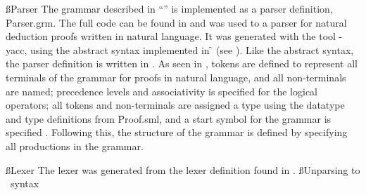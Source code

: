 \documentclass[BA.tex]{subfiles}
\begin{document}
\ss{Parser}
The grammar described in ``'' is implemented as a parser
 definition, \f{Parser.grm}. The full code can be found in 
 and was used to  a parser for natural deduction proofs
 written in natural language. It was generated with the tool -yacc,
 using the abstract syntax implemented in \f{}
 (see ). Like the abstract syntax, the parser definition is
 written in .
 As seen in , tokens are defined to
 represent all terminals of the grammar for proofs in natural language,
 and all non-terminals are named; precedence levels and
 associativity is specified for the logical operators; all tokens and
 non-terminals are assigned a type using the datatype and type definitions
 from \f{Proof.sml}, and a start symbol for the grammar is specified
 .
 Following this, the structure of the grammar is defined by specifying all
 productions in the grammar.

 
\ss{Lexer}
The lexer was generated from the lexer definition found in .
\ss{Unparsing to \bp\ syntax}
\FIX{}
\end{document}
